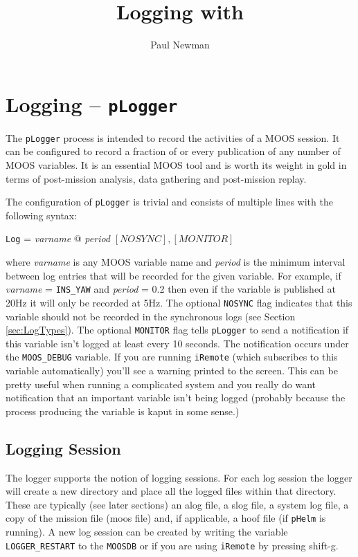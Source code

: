 \documentclass[a4paper,10pt]{article}
\title{Logging with \code{pLogger}}
\author{Paul Newman}
\newcommand{\Code}[1]{\texttt{#1} }
\newcommand{\code}[1]{\Code{#1} }
\begin{document}
\maketitle

\begin{center}
\end{center}

\section{Logging -- \code{pLogger}}
The \code{pLogger} process is intended to record the activities of
a MOOS session. It can be configured to record a fraction of or
every publication of any number of MOOS variables. It is an
essential MOOS tool and is worth its weight in gold in terms of
post-mission analysis, data gathering and post-mission replay.

The configuration of \code{pLogger} is trivial and consists of
multiple lines with the following syntax:
\begin{center}
\code{Log} =  {\it{varname}} @ {\it{period}} $[NOSYNC],[MONITOR]$
\end{center}
where {\it{varname}} is any MOOS variable name and {\it{period}}
is the minimum interval between log entries that will be recorded
for the given variable. For example, if
{\it{varname}} = \code{INS\_YAW} and {\it{period}} = 0.2 then even
if the variable is published at 20Hz it will only be recorded at
5Hz. The optional \code{NOSYNC} flag indicates that this variable
should not be recorded in the synchronous logs (see Section
\ref{sec:LogTypes}). The optional \code{MONITOR} flag tells \code{pLogger} to send a notification if this variable isn't logged at least every 10 seconds. The notification occurs under the \code{MOOS\_DEBUG} variable. If you are running \code{iRemote} (which subscribes to this variable
automatically) you'll see a warning printed to the screen. This can be pretty useful when running
a complicated system and you really do want notification that an important variable isn't being logged (probably because the process producing the variable is kaput in some sense.)

\subsection{Logging Session}

The logger supports the notion of logging sessions. For each log session the logger will create a new directory and place all the logged files within that directory. These are typically (see later sections) an alog file, a slog file, a system log file, a copy of the mission file (moos file) and, if applicable, a hoof file (if  \code{pHelm} is running). A new log session can be created by writing the variable \code{LOGGER\_RESTART} to the \code{MOOSDB} or if you are using \code{iRemote} by pressing shift-g.
\end{document}
